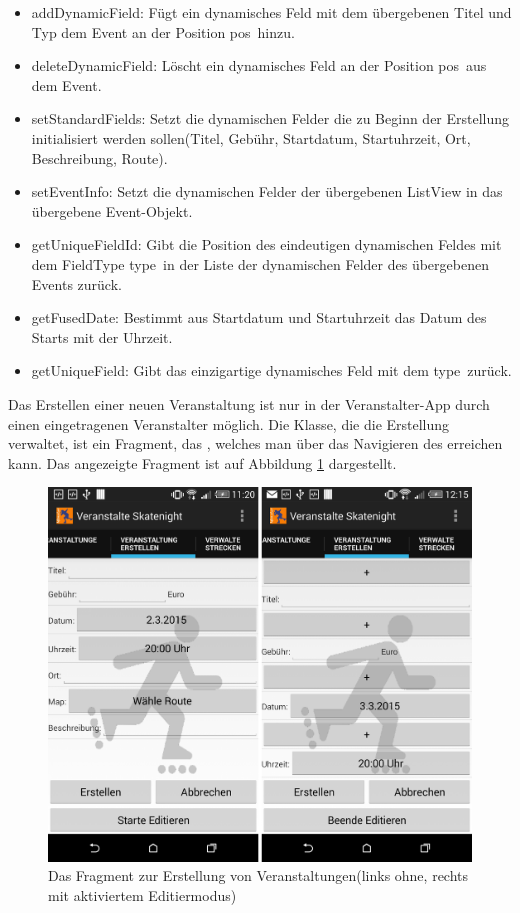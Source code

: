 \begin{itemize}
	\item addDynamicField: Fügt ein dynamisches Feld mit dem übergebenen Titel und Typ dem Event an der Position \glqq pos\grqq\ hinzu.
	\item deleteDynamicField: Löscht ein dynamisches Feld an der Position \glqq pos\grqq\ aus dem Event.
	\item setStandardFields: Setzt die dynamischen Felder die zu Beginn der Erstellung initialisiert werden sollen(Titel, Gebühr, Startdatum, Startuhrzeit, Ort, Beschreibung, Route).
	\item setEventInfo: Setzt die dynamischen Felder der übergebenen ListView in das übergebene Event-Objekt.
	\item getUniqueFieldId: Gibt die Position des eindeutigen dynamischen Feldes mit dem FieldType \glqq type\grqq\ in der Liste der dynamischen Felder des übergebenen Events zurück.
	\item getFusedDate: Bestimmt aus Startdatum und Startuhrzeit das Datum des Starts mit der Uhrzeit.
	\item getUniqueField: Gibt das einzigartige dynamisches Feld mit dem  \glqq type\grqq\ zurück.
\end{itemize}

Das Erstellen einer neuen Veranstaltung ist nur in der Veranstalter-App durch einen eingetragenen Veranstalter möglich. Die Klasse, die die Erstellung verwaltet, ist ein Fragment, das , welches man über das Navigieren des  erreichen kann. Das angezeigte Fragment ist auf Abbildung \ref{fig:VeranstaltungErstellen} dargestellt.

\begin{figure}[htb]
\centering
\includegraphics[width=12 cm]{graphics/Fragment_Veranstaltung_erstellen.png}
\caption{Das Fragment zur Erstellung von Veranstaltungen(links ohne, rechts mit aktiviertem Editiermodus)}
\label{fig:VeranstaltungErstellen}
\end{figure}

